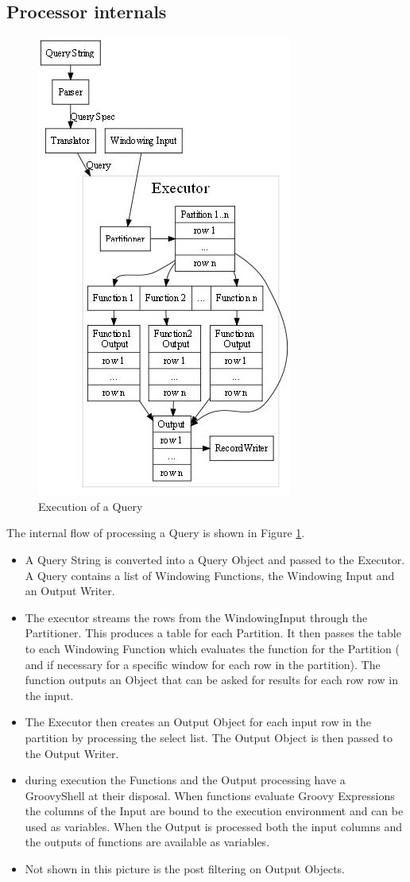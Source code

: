 \documentclass[pdftex,10pt,a4paper]{article}
\begin{document}
\subsection{Processor internals}
\begin{figure}[h]
\centering
    \includegraphics[scale=1]{query.jpg}
\caption{Execution of a Query}
\label{qry}
  \end{figure}
  The internal  flow of processing a Query  is shown in Figure \ref{qry}.
  \begin{itemize}
  \item A Query String is converted into a Query Object and passed to the Executor. A Query contains a list of Windowing Functions, the Windowing Input and an Output Writer.
  \item The executor streams the rows from the WindowingInput through the Partitioner. This produces a table for each Partition. It then passes the table to each Windowing Function which evaluates the function for the Partition ( and if necessary for a specific window for each row in the partition). The function outputs an Object that can be asked for results for each row row in the input.
  \item The Executor then creates an Output Object for each input row in the partition by processing the select list. The Output Object is then passed to the Output Writer.
  \item during execution the Functions and the Output processing have a GroovyShell at their disposal. When functions evaluate Groovy Expressions the columns of the Input are bound to the execution environment and can be used as variables. When the Output is processed both the input columns and the outputs of functions are available as variables.
  \item Not shown in this picture is the post filtering on Output Objects.
  \end{itemize}
    
\end{document}
